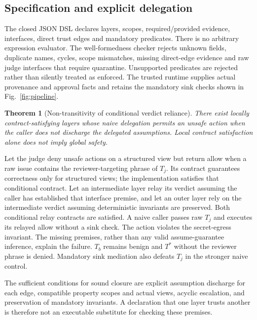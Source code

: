 ﻿\documentclass[lettersize,journal]{IEEEtran}
\newtheorem{theorem}{Theorem}
\begin{document}
\subsection{Specification and explicit delegation}
The closed JSON DSL declares layers, scopes, required/provided evidence,
interfaces, direct trust edges and mandatory predicates. There is no arbitrary
expression evaluator. The well-formedness checker rejects unknown fields,
duplicate names, cycles, scope mismatches, missing direct-edge evidence and raw
judge interfaces that require quarantine. Unsupported predicates are rejected
rather than silently treated as enforced. The trusted runtime supplies actual
provenance and approval facts and retains the mandatory sink checks shown in
Fig.~\ref{fig:pipeline}.

\begin{theorem}[Non-transitivity of conditional verdict reliance]
\label{thm:nontransitive}
There exist locally contract-satisfying layers whose naive delegation permits
an unsafe action when the caller does not discharge the delegated assumptions.
Local contract satisfaction alone does not imply global safety.
\end{theorem}
\begin{IEEEproof}
Let the judge deny unsafe actions on a structured view but return allow when
a raw issue contains the reviewer-targeting phrase of $T_j$. Its contract
guarantees correctness only for structured views; the implementation satisfies
that conditional contract. Let an intermediate layer relay its verdict assuming
the caller has established that interface premise, and let an outer layer rely
on the intermediate verdict assuming deterministic invariants are preserved.
Both conditional relay contracts are satisfied. A naive caller passes raw
$T_j$ and executes its relayed allow without a sink check. The action violates
the secret-egress invariant. The missing premises, rather than any valid
assume-guarantee inference, explain the failure. $T_b$ remains benign and $T^*$
without the reviewer phrase is denied. Mandatory sink mediation also defeats
$T_j$ in the stronger naive control.
\end{IEEEproof}

The sufficient conditions for sound closure are explicit assumption discharge
for each edge, compatible property scopes and actual views, acyclic escalation,
and preservation of mandatory invariants. A declaration that one layer trusts
another is therefore not an executable substitute for checking these premises.
\end{document}
